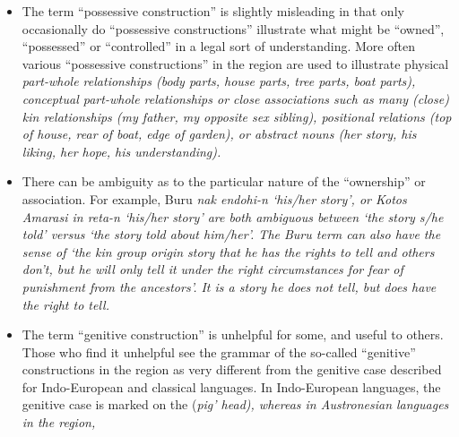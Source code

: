 \begin{itemize}
				inalienable possession, and proclitics to mark alienable possession,
				nevertheless when there is an explicit possessor it is pre-posed
				in both constructions (see ).
				However, with many Papuan languages of TAP
				and , the preposed possessor proclitics/prefixes
				are often the only possessor to be found.
				We also note that in natural texts in most languages,
				an explicit possessor is often omitted from possessive constructions
				because it is known from the discourse context.
				Sometimes explicit possessors are most commonly used in natural
				texts to disambiguate  from ,
				or  from ,
				depending on where ambiguity is found in a particular language.
	\item The term “possessive construction” is slightly misleading
				in that only occasionally do “possessive constructions” illustrate
				what might be “owned”,
				“possessed” or “controlled” in a legal sort of understanding.
				More often various ``possessive constructions'' in the region are
				used to illustrate physical \it{part-whole} relationships (body
				parts, house parts, tree parts,
				boat parts), conceptual part-whole relationships or close associations
				such as many (close) kin relationships (\it{my father,
				my opposite sex sibling}),
				positional relations (\it{top of house,
				rear of boat, edge of garden}),
				or abstract nouns (\it{her story,
				his liking, her hope, his understanding}).
	\item There can be ambiguity as to the particular nature of
				the ``ownership'' or association.
				For example, Buru \it{nak endohi-n} ‘his/her story’,
				or Kotos Amarasi \it{in reta-n} ‘his/her story’ are both ambiguous
				between ‘the story s/he told’ versus ‘the story told about him/her’.
				The Buru term can also have the sense of ‘the kin group origin
				story that he has the rights to tell
				and others don’t, but he will only tell it under the right circumstances
				for fear of punishment from the ancestors’.
				It is a story he does not tell,
				but does have the right to tell.
	\item The term “genitive construction” is unhelpful for
				some, and useful to others.
				Those who find it unhelpful see the grammar of the so-called
				“genitive” constructions in the region as very different
				from the genitive case described for Indo-European and classical languages.
				In Indo-European languages, the genitive case is marked on the
				 (\it{pig’ head}), whereas in Austronesian languages in the region,

\end{itemize}
